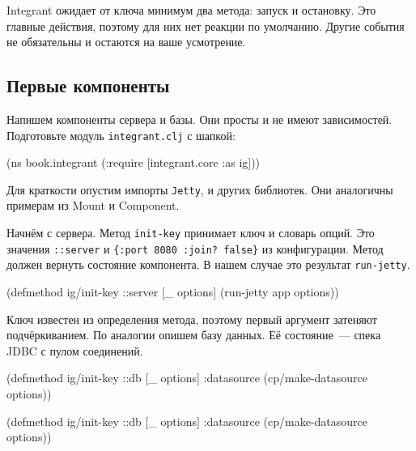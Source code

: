 Integrant ожидает от ключа минимум два метода: запуск и остановку. Это главные
действия, поэтому для них нет реакции по умолчанию. Другие события не
обязательны и остаются на ваше усмотрение.

\subsection{Первые компоненты}


Напишем компоненты сервера и базы. Они просты и не имеют
зависимостей. Подготовьте модуль \verb|integrant.clj| с шапкой:

\begin{english}
  \begin{clojure}
(ns book.integrant
  (:require [integrant.core :as ig]))
  \end{clojure}
\end{english}

Для краткости опустим импорты \verb|Jetty|,  и других
библиотек. Они аналогичны примерам из Mount и Component.

Начнём с сервера. Метод \verb|init-key| принимает ключ и словарь опций. Это
значения \verb|::server| и \verb|{:port 8080 :join? false}| из
конфигурации. Метод должен вернуть состояние компонента. В нашем случае это
результат \verb|run-jetty|.

\begin{english}
  \begin{clojure}
(defmethod ig/init-key ::server
  [_ options]
  (run-jetty app options))
  \end{clojure}
\end{english}


Ключ известен из определения метода, поэтому первый аргумент затеняют
подчёркиванием. По аналогии опишем базу данных. Её состояние~--- спека JDBC с
пулом соединений.

\ifnarrow

\begin{english}
  \begin{clojure}
(defmethod ig/init-key ::db
  [_ options]
  {:datasource
    (cp/make-datasource options)})
  \end{clojure}
\end{english}

\else

\begin{english}
  \begin{clojure}
(defmethod ig/init-key ::db
  [_ options]
  {:datasource (cp/make-datasource options)})
  \end{clojure}
\end{english}

